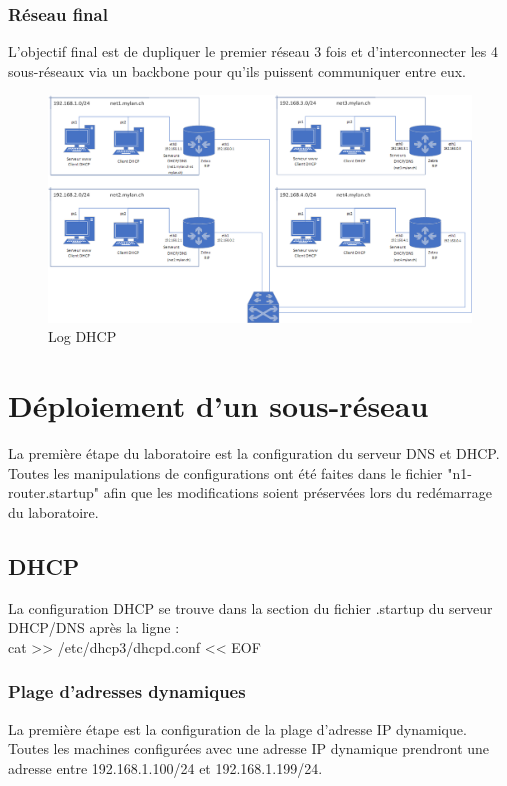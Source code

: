 \documentclass{article}
\begin{document}
\subsubsection{Réseau final}
L'objectif final est de dupliquer le premier réseau 3 fois et d'interconnecter les 4 sous-réseaux via un backbone pour qu'ils puissent communiquer entre eux.\\

\begin{figure}[!h]
	\centering
	\includegraphics[width=\textwidth]{./schemas/Schema-complet.png}
	\caption{Log DHCP}
	\label{fig:Log DHCP}
\end{figure}
\clearpage

\section{Déploiement d'un sous-réseau}
La première étape du laboratoire est la configuration du serveur DNS et DHCP. Toutes les manipulations de configurations ont été faites dans le fichier "n1-router.startup" afin que les modifications soient préservées lors du redémarrage du laboratoire.

\subsection{DHCP}
La configuration DHCP se trouve dans la section du fichier .startup du serveur DHCP/DNS après la ligne : \\

cat >> /etc/dhcp3/dhcpd.conf << EOF

\subsubsection{Plage d'adresses dynamiques}
La première étape est la configuration de la plage d'adresse IP dynamique. Toutes les machines configurées avec une adresse IP dynamique prendront une adresse entre 192.168.1.100/24 et 192.168.1.199/24.\\
\end{document}
